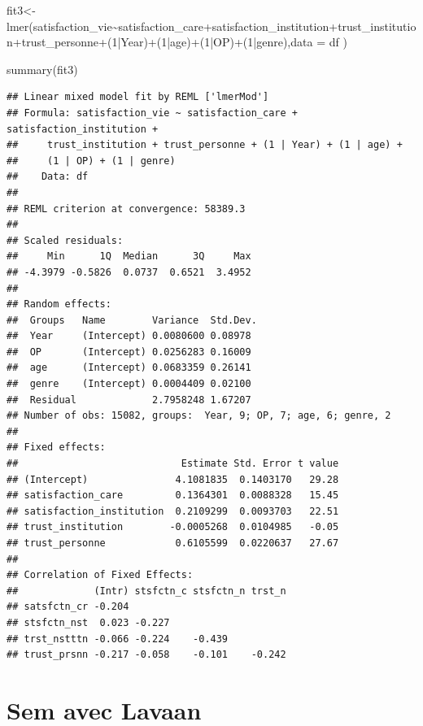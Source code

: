 \documentclass[
]{book}
\newenvironment{Shaded}{\begin{snugshade}}{\end{snugshade}}
\newcommand{\AttributeTok}[1]{\textcolor[rgb]{0.77,0.63,0.00}{#1}}
\newcommand{\DecValTok}[1]{\textcolor[rgb]{0.00,0.00,0.81}{#1}}
\newcommand{\FunctionTok}[1]{\textcolor[rgb]{0.00,0.00,0.00}{#1}}
\newcommand{\NormalTok}[1]{#1}
\newcommand{\OtherTok}[1]{\textcolor[rgb]{0.56,0.35,0.01}{#1}}
\newcommand{\SpecialCharTok}[1]{\textcolor[rgb]{0.00,0.00,0.00}{#1}}
\begin{document}
\begin{Shaded}
\begin{Highlighting}[]
\NormalTok{fit3}\OtherTok{\textless{}{-}}\FunctionTok{lmer}\NormalTok{(satisfaction\_vie}\SpecialCharTok{\textasciitilde{}}\NormalTok{satisfaction\_care}\SpecialCharTok{+}\NormalTok{satisfaction\_institution}\SpecialCharTok{+}\NormalTok{trust\_institution}\SpecialCharTok{+}\NormalTok{trust\_personne}\SpecialCharTok{+}\NormalTok{(}\DecValTok{1}\SpecialCharTok{|}\NormalTok{Year)}\SpecialCharTok{+}\NormalTok{(}\DecValTok{1}\SpecialCharTok{|}\NormalTok{age)}\SpecialCharTok{+}\NormalTok{(}\DecValTok{1}\SpecialCharTok{|}\NormalTok{OP)}\SpecialCharTok{+}\NormalTok{(}\DecValTok{1}\SpecialCharTok{|}\NormalTok{genre),}\AttributeTok{data =}\NormalTok{ df )}

\FunctionTok{summary}\NormalTok{(fit3)}
\end{Highlighting}
\end{Shaded}

\begin{verbatim}
## Linear mixed model fit by REML ['lmerMod']
## Formula: satisfaction_vie ~ satisfaction_care + satisfaction_institution +  
##     trust_institution + trust_personne + (1 | Year) + (1 | age) +  
##     (1 | OP) + (1 | genre)
##    Data: df
## 
## REML criterion at convergence: 58389.3
## 
## Scaled residuals: 
##     Min      1Q  Median      3Q     Max 
## -4.3979 -0.5826  0.0737  0.6521  3.4952 
## 
## Random effects:
##  Groups   Name        Variance  Std.Dev.
##  Year     (Intercept) 0.0080600 0.08978 
##  OP       (Intercept) 0.0256283 0.16009 
##  age      (Intercept) 0.0683359 0.26141 
##  genre    (Intercept) 0.0004409 0.02100 
##  Residual             2.7958248 1.67207 
## Number of obs: 15082, groups:  Year, 9; OP, 7; age, 6; genre, 2
## 
## Fixed effects:
##                            Estimate Std. Error t value
## (Intercept)               4.1081835  0.1403170   29.28
## satisfaction_care         0.1364301  0.0088328   15.45
## satisfaction_institution  0.2109299  0.0093703   22.51
## trust_institution        -0.0005268  0.0104985   -0.05
## trust_personne            0.6105599  0.0220637   27.67
## 
## Correlation of Fixed Effects:
##             (Intr) stsfctn_c stsfctn_n trst_n
## satsfctn_cr -0.204                           
## stsfctn_nst  0.023 -0.227                    
## trst_nstttn -0.066 -0.224    -0.439          
## trust_prsnn -0.217 -0.058    -0.101    -0.242
\end{verbatim}

\hypertarget{sem-avec-lavaan}{%
\section{Sem avec Lavaan}\label{sem-avec-lavaan}}
\end{document}
